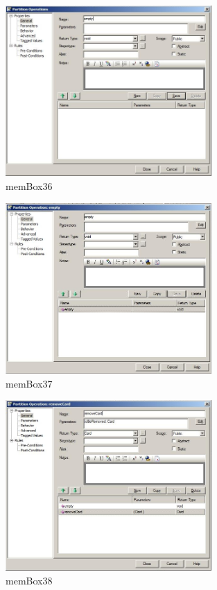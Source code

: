 \begin{figure}[!h]
	\centering
  \includegraphics[width=0.7\textwidth]{pics/memBox36.png}
	\caption{memBox36}
	\label{memBox36}
\end{figure}

\begin{figure}[!h]
	\centering
  \includegraphics[width=0.7\textwidth]{pics/memBox37.png}
	\caption{memBox37}
	\label{memBox37}
\end{figure}

\begin{figure}[!h]
	\centering
  \includegraphics[width=0.7\textwidth]{pics/memBox38.png}
	\caption{memBox38}
	\label{memBox38}
\end{figure}

